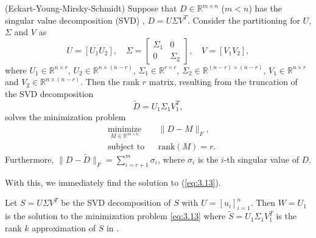 \begin{theorem} \label{theorem:3.1}
(Eckart-Young-Mirsky-Schmidt) Suppose that $D\in \mathbb R^{m\times n}$ ($m<n$) has the singular value decomposition (SVD) \cite{Markovsky:2011:LRA:2103589}, $D = U \Sigma V^T$. Consider the partitioning for $U$, $\Sigma$ and $V$ as
\begin{equation} \label{eq:3.14}
	U = [U_1 U_2], \quad \Sigma =
	\begin{bmatrix}
		\Sigma_1 & 0 \\
		0 & \Sigma_2
	\end{bmatrix}
	, \quad V = [V_1 V_2],
\end{equation}
where $U_1\in \mathbb R^{n\times r}$, $U_2 \in \mathbb R^{n\times (n-r)}$, $\Sigma_1 \in \mathbb R^{r\times r}$, $\Sigma_2 \in \mathbb R^{(n-r)\times (n-r)}$, $V_1 \in \mathbb R^{n\times r}$ and $V_2 \in \mathbb R^{n\times (n-r)}$. Then the rank $r$ matrix, resulting from the truncation of the SVD decomposition
\begin{equation} \label{eq:3.15}
	\tilde D = U_1 \Sigma_1 V_1^T,
\end{equation}
solves the minimization problem
\begin{equation} \label{eq:3.16}
\begin{aligned}
&  \underset{M\in\mathbb R^{m\times n}}{\text{minimize}}
& & \| D - M \|_F, \\
& \text{subject to}
& & \text{rank}(M) = r.
\end{aligned}
\end{equation}
Furthermore, $\| D - \tilde D \|_F = \sum_{i=r+1}^{m} \sigma_i$, where $\sigma_i$ is the $i$-th singular value of $D$.
\end{theorem} \label{theorem:3.2}
With this, we immediately find the solution to (\ref{eq:3.13}).
\begin{theorem} \label{theorem:3.2}
\cite{doi:10.1137/1.9780898718713} Let $S = U \Sigma V^T$ be the SVD decomposition of $S$ with $U = [u_i]_{i=1}^n$. Then $W = U_1$ is the solution to the minimization problem \eqref{eq:3.13} where $\tilde S = U_1\Sigma_1 V_1^T$ is the rank $k$ approximation of $S$ in .
\end{theorem}

